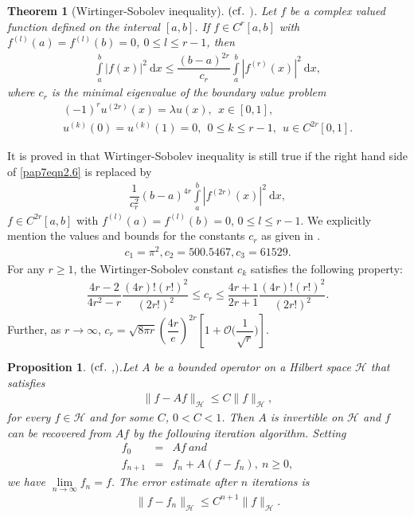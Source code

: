 \documentclass[a4paper,12pt,reqno]{amsart}
\theoremstyle{plain}
\newtheorem{thm}{Theorem}[section]
\numberwithin{equation}{section}
\newtheorem{prop}{Proposition}[section]
\theoremstyle{definition}
\begin{document}
\begin{thm}[Wirtinger-Sobolev inequality]\label{pap2WirSob}$(\mathop{\rm cf.~}$\cite{BoWi}$)$.
Let $f$ be a complex valued  function defined on the interval $\left[a,b\right]$.
If $f\in C^{r}\left[a,b\right]$ with $f^{(l)}(a)=f^{(l)}(b)=0$, $0\leq l\leq r-1$, then
\begin{eqnarray}\label{pap7eqn2.6}
\int\limits_a^b|f(x)|^2~\mathrm{d}x\leq \dfrac{(b-a)^{2r}}{c_r}\int\limits_a^b|f^{(r)}(x)|^2~\mathrm{d}x,
\end{eqnarray}
where $c_r$ is the minimal eigenvalue of the boundary value problem
\begin{eqnarray*}
(-1)^r u^{(2r)}(x)=\lambda u(x),~~ x\in[0,1],\\
u^{(k)}(0)=u^{(k)}(1)=0, ~~0\leq k\leq r-1,~~u\in C^{2r}[0,1].
\end{eqnarray*}
\end{thm}
It is proved in \cite{AntoRad3} that Wirtinger-Sobolev inequality is still true if the right hand side of \eqref{pap7eqn2.6} is replaced by
\begin{eqnarray}\label{pap7eqn2.6a}
\dfrac{1}{c_r^2}(b-a)^{4r}\int\limits_a^b|f^{(2r)}(x)|^2~\mathrm{d}x,
\end{eqnarray}
$f\in C^{2r}\left[a,b\right]$ with $f^{(l)}(a)=f^{(l)}(b)=0$, $0\leq l\leq r-1$.
We explicitly mention the values and bounds for the constants $c_r$ as given in \cite{BoWi}.
\begin{eqnarray*}
c_1=\pi^2, c_2=500.5467, c_3=61529.
\end{eqnarray*}
For any $r\geq 1$, the Wirtinger-Sobolev constant $c_k$ satisfies the following property:
\begin{eqnarray}\label{pap3eqn2.18}
\dfrac{4r-2}{4r^2-r}\dfrac{(4r)!(r!)^2}{(2r!)^2}\leq c_r\leq\dfrac{4r+1}{2r+1}\dfrac{(4r)!(r!)^2}{(2r!)^2}.
\end{eqnarray}
Further, as $r\to \infty$, $c_r=\sqrt{8\pi r}\left(\dfrac{4r}{e}\right)^{2r}\left[1+\mathcal{O}\Big(\dfrac{1}{\sqrt{r}}\Big)\right]$.
\begin{prop}$(\mathop{\rm cf.~}$\cite{FeiGr},\cite{Raza}$)$.\label{pap2prop2.1}
Let $A$ be a bounded operator on a Hilbert space $\mathcal{H}$ that satisfies
\begin{align*}
\|f-Af\|_\mathcal{H}\leq C\|f\|_\mathcal{H},
\end{align*}
for every $f\in \mathcal{H}$ and for some $C$, $0<C<1$.
Then $A$ is invertible on $\mathcal{H}$ and $f$ can be recovered from $Af$ by the following iteration algorithm.
Setting
\begin{eqnarray*}
f_0&=& A f ~and \\
f_{n+1}&=&f_n+A(f-f_n), ~n\geq 0,
\end{eqnarray*}
we have $\lim\limits_{n\to\infty}f_n=f$. The error estimate after $n$ iterations is
\begin{align*}
\|f-f_n\|_\mathcal{H}\leq C^{n+1}\|f\|_\mathcal{H}.
\end{align*}
\end{prop}
\end{document}

